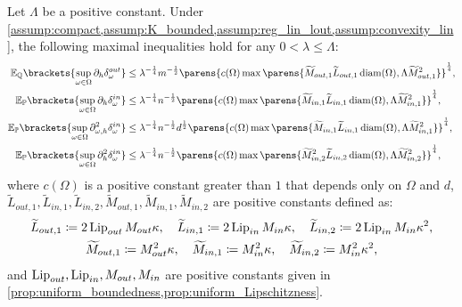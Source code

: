 \begin{proposition}\label{prop:exp_uni_bound_2}
Let $\Lambda$ be a positive constant. 
Under \cref{assump:compact,assump:K_bounded,assump:reg_lin_lout,assump:convexity_lin}, the following maximal inequalities hold for any $0<\lambda\leq \Lambda$:
 \begin{align*}
 	\mathbb{E}_{\mathbb{Q}}\brackets{\sup_{\omega\in \Omega} \Douth }&\leq 
 	{\lambda^{-\frac{1}{4}}m^{-\frac{1}{2}}  \parens{c(\Omega)\max\parens{\widetilde{M}_{out,1}\widetilde{L}_{out,1}\diam(\Omega),\Lambda\widetilde{M}_{out,1}^2}}^{\frac{1}{4}}},\\
 	\mathbb{E}_{\mathbb{P}}\brackets{\sup_{\omega\in \Omega} \Dinh }&\leq 
 	{\lambda^{-\frac{1}{4}}n^{-\frac{1}{2}} \parens{c(\Omega)\max\parens{\widetilde{M}_{in,1}\widetilde{L}_{in,1}\diam(\Omega),\Lambda\widetilde{M}_{in,1}^2}}^{\frac{1}{4}}},\\
 	 	\mathbb{E}_{\mathbb{P}}\brackets{\sup_{\omega\in \Omega} \Dinwh }&\leq 
 	{\lambda^{-\frac{1}{4}}n^{-\frac{1}{2}}d^{\frac{1}{2}} \parens{c(\Omega)\max\parens{\widetilde{M}_{in,1}\widetilde{L}_{in,1}\diam(\Omega),\Lambda\widetilde{M}_{in,1}^2}}^{\frac{1}{4}}},\\
 	\mathbb{E}_{\mathbb{P}}\brackets{\sup_{\omega\in \Omega} \Dinhh }&\leq 
 	{\lambda^{-\frac{1}{4}}n^{-\frac{1}{2}} \parens{c(\Omega)\max\parens{\widetilde{M}^2_{in,2}\widetilde{L}_{in,2}\diam(\Omega),\Lambda\widetilde{M}^2_{in,2}}}^{\frac{1}{4}}},
 \end{align*}
 where $c(\Omega)$ is a positive constant {greater than $1$} that depends only on $\Omega$ and $d$, {$\widetilde{L}_{out,1},\widetilde{L}_{in,1},\widetilde{L}_{in,2},\widetilde{M}_{out,1},\widetilde{M}_{in,1},\widetilde{M}_{in,2}$ are positive constants defined as:
 \begin{gather*}
     \widetilde{L}_{out,1}\coloneqq 2\operatorname{Lip}_{out} M_{out}\kappa,\quad\widetilde{L}_{in,1}\coloneqq 2\operatorname{Lip}_{in} M_{in}\kappa,\quad\widetilde{L}_{in,2}\coloneqq 2\operatorname{Lip}_{in} M_{in}\kappa^2,\\
     \widetilde{M}_{out,1}\coloneqq M_{out}^2\kappa,\quad\widetilde{M}_{in,1}\coloneqq M_{in}^2\kappa,\quad\widetilde{M}_{in,2}\coloneqq M_{in}^2\kappa^2,
 \end{gather*}
 and $\operatorname{Lip}_{out},\operatorname{Lip}_{in},M_{out},M_{in}$ are positive constants given in \cref{prop:uniform_boundedness,prop:uniform_Lipschitzness}.}
 
\end{proposition}

